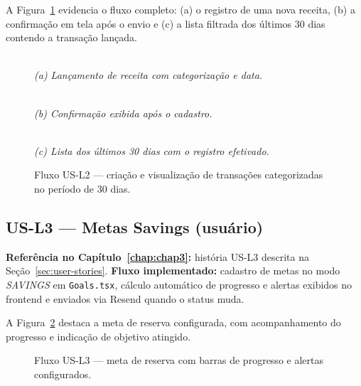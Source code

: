 A Figura~\ref{fig:us-l2} evidencia o fluxo completo: (a) o registro de uma nova receita, (b) a confirmação em tela após o envio e (c) a lista filtrada dos últimos 30 dias contendo a transação lançada.

\begin{figure}[!htbp]
\centering
{}\\
\smallskip
\textit{(a) Lançamento de receita com categorização e data.}

\par\medskip

\\
\smallskip
\textit{(b) Confirmação exibida após o cadastro.}

\par\medskip

\\
\smallskip
\textit{(c) Lista dos últimos 30 dias com o registro efetivado.}
\caption{Fluxo US-L2 — criação e visualização de transações categorizadas no período de 30 dias.}
\label{fig:us-l2}
\end{figure}

\FloatBarrier

\subsection{US-L3 — Metas Savings (usuário)}
\textbf{Referência no Capítulo~\ref{chap:chap3}:} história US-L3 descrita na Seção~\ref{sec:user-stories}.
\textbf{Fluxo implementado:} cadastro de metas no modo \textit{SAVINGS} em \texttt{Goals.tsx}, cálculo automático de progresso e alertas exibidos no frontend e enviados via Resend quando o status muda.

A Figura~\ref{fig:us-l3} destaca a meta de reserva configurada, com acompanhamento do progresso e indicação de objetivo atingido.

\begin{figure}[!htbp]
\centering
{}
\caption{Fluxo US-L3 — meta de reserva com barras de progresso e alertas configurados.}
\label{fig:us-l3}
\end{figure}

